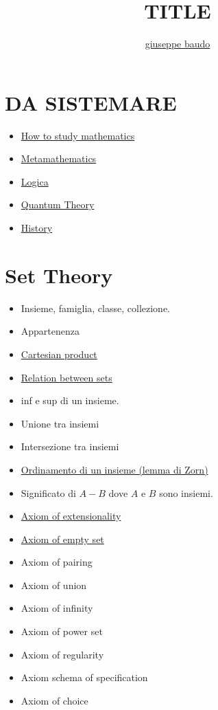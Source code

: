 \documentclass[a4paper,10pt]{article}
\title{TITLE}
\author{\href{http://www.baudo.hol.es}{giuseppe baudo}}
\begin{document}
\maketitle


\section{DA SISTEMARE}
\begin{itemize}
 \item \href{HowToStudy.html}{How to study mathematics}
  \item \href{Metamathematics.html}{Metamathematics}
  \item \href{Logics.html}{Logica}
  \item \href{QuantumTheory.html}{Quantum Theory}
  \item \href{history.html}{History} 
\end{itemize}

\section{Set Theory}

\begin{itemize}
 \item Insieme, famiglia, classe, collezione.
 \item Appartenenza
 \item \href{CartesianProduct.html}{Cartesian product}
 \item \href{Relation.html}{Relation between sets}
 \item inf e sup di un insieme.
 \item Unione tra insiemi
 \item Intersezione tra insiemi
 \item \href{OrdinamentoInsieme.html}{Ordinamento di un insieme (lemma di Zorn)}
 \item Significato di $A - B$ dove $A$ e $B$ sono insiemi.
\end{itemize}


\begin{itemize}
 \item \href{./Extensionality.html}{Axiom of extensionality}
 \item \href{./EmptySet.html}{Axiom of empty set}
 \item Axiom of pairing
 \item Axiom of union
 \item Axiom of infinity
 \item Axiom of power set
 \item Axiom of regularity
 \item Axiom schema of specification
 \item Axiom of choice
\end{itemize}
\end{document}
